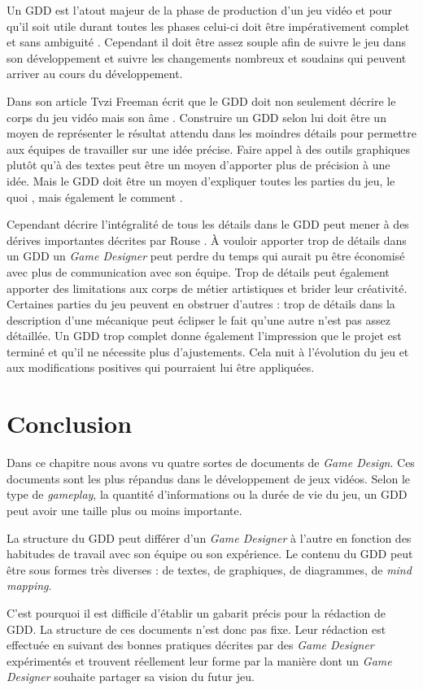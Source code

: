 Un GDD est l'atout majeur de la phase de production d'un jeu vidéo et pour qu'il soit utile durant toutes les phases celui-ci doit être impérativement complet et sans ambiguité \cite{GD_Guidelines}. Cependant il doit être assez souple afin de suivre le jeu dans son développement et suivre les changements nombreux et soudains qui peuvent arriver au cours du développement.

Dans son article  \cite{gama_greateGDD} Tvzi Freeman écrit que le GDD doit non seulement décrire le corps du jeu vidéo mais son \guillemotleft âme \guillemotright. Construire un GDD selon lui doit être un moyen de représenter le résultat attendu dans les moindres détails pour permettre aux équipes de travailler sur une idée précise. Faire appel à des outils graphiques plutôt qu'à des textes peut être un moyen d'apporter plus de précision à une idée. Mais le GDD doit être un moyen d'expliquer toutes les parties du jeu, le \guillemotleft quoi \guillemotright, mais également le \guillemotleft comment \guillemotright.

Cependant décrire l'intégralité de tous les détails dans le GDD peut mener à des dérives importantes décrites par Rouse \cite{GD_theory_rouse}. À vouloir apporter trop de détails dans un GDD un \emph{Game Designer} peut perdre du temps qui aurait pu être économisé avec plus de communication avec son équipe. Trop de détails peut également apporter des limitations aux corps de métier artistiques et brider leur créativité. Certaines parties du jeu peuvent en obstruer d'autres : trop de détails dans la description d'une mécanique peut éclipser le fait qu'une autre n'est pas assez détaillée. Un GDD trop complet donne également l'impression que le projet est terminé et qu'il ne nécessite plus d'ajustements. Cela nuit à l'évolution du jeu et aux modifications positives qui pourraient lui être appliquées.



\section{Conclusion}
Dans ce chapitre nous avons vu quatre sortes de documents de \emph{Game Design}. Ces documents sont les plus répandus dans le développement de jeux vidéos. Selon le type de \emph{gameplay}, la quantité d'informations ou la durée de vie du jeu, un GDD peut avoir une taille plus ou moins importante. 

La structure du GDD peut différer d'un \emph{Game Designer} à l'autre en fonction des habitudes de travail avec son équipe ou son expérience. Le contenu du GDD peut être sous formes très diverses : de textes, de graphiques, de diagrammes, de \emph{mind mapping}. 

C'est pourquoi il est difficile d'établir un gabarit précis pour la rédaction de GDD. La structure de ces documents n'est donc pas fixe. Leur rédaction est effectuée en suivant des bonnes pratiques décrites par des \emph{Game Designer} expérimentés et trouvent réellement leur forme par la manière dont un \emph{Game Designer} souhaite partager sa vision du futur jeu.
